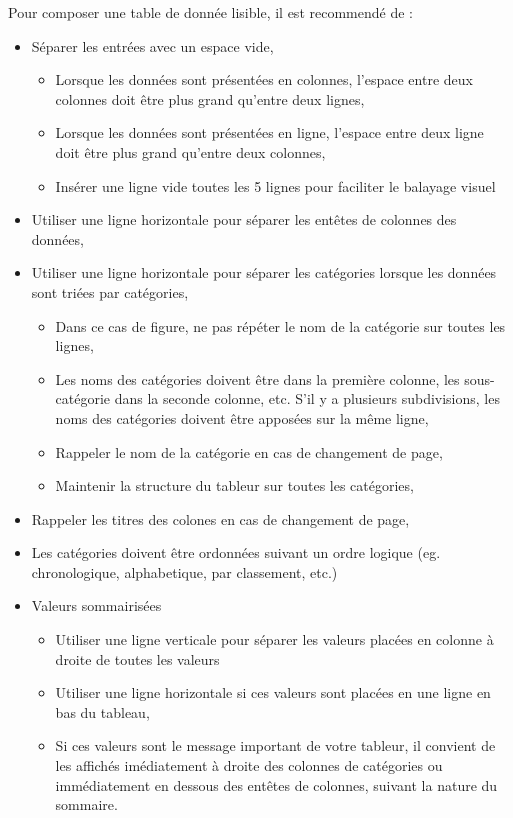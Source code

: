 \documentclass[a4paper,12pt]{article}
\begin{document}
\begin{multicols}{2}
Pour composer une table de donnée lisible, il est recommendé de :
\begin{itemize}
\item Séparer les entrées avec un espace vide,
\begin{itemize}
\item Lorsque les données sont présentées en colonnes, l'espace entre deux colonnes doit être plus grand qu'entre deux lignes,
\item Lorsque les données sont présentées en ligne, l'espace entre deux ligne doit être plus grand qu'entre deux colonnes,
\item Insérer une ligne vide toutes les 5 lignes pour faciliter le balayage visuel\autocite{NFENISO9241-125ErgonomieLinteractionHommesysteme2017}
\end{itemize}
\item Utiliser une ligne horizontale pour séparer les entêtes de colonnes des données,
\item Utiliser une ligne horizontale pour séparer les catégories lorsque les données sont triées par catégories,
\begin{itemize}
\item Dans ce cas de figure, ne pas répéter le nom de la catégorie sur toutes les lignes,
\item Les noms des catégories doivent être dans la première colonne, les sous-catégorie dans la seconde colonne, etc. S'il y a plusieurs subdivisions, les noms des catégories doivent être apposées sur la même ligne,
\item Rappeler le nom de la catégorie en cas de changement de page,
\item Maintenir la structure du tableur sur toutes les catégories,
\end{itemize}
\item Rappeler les titres des colones en cas de changement de page,
\item Les catégories doivent être ordonnées suivant un ordre logique (eg. chronologique, alphabetique, par classement, etc.)
\item Valeurs sommairisées
\begin{itemize}
\item Utiliser une ligne verticale pour séparer les valeurs placées en colonne à droite de toutes les valeurs
\item Utiliser une ligne horizontale si ces valeurs sont placées en une ligne en bas du tableau,
\item Si ces valeurs sont le message important de votre tableur, il convient de les affichés imédiatement à droite des colonnes de catégories ou immédiatement en dessous des entêtes de colonnes, suivant la nature du sommaire.

\end{itemize}
\end{itemize}
\end{multicols}
\end{document}

